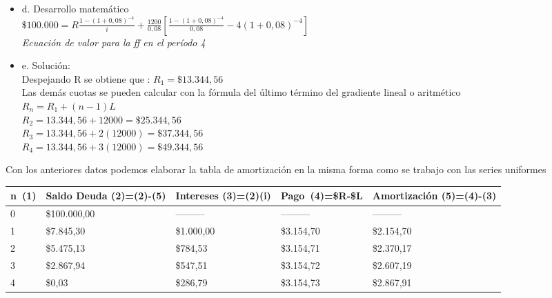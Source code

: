 \begin{itemize}
\begin{itemize}
			\item d. Desarrollo matemático\\
			$\$100.000 = R	\frac{1-(1+0,08)^{-4}}{i}+\frac{1200}{0,08}[\frac{1-(1+0,08)^{-4}}{0,08}- 4(1+0,08)^{-4}]$ 
			\\
			\textit{Ecuación de valor para la ff en el período 4}\\
			\item e. Solución:\\
			Despejando R se obtiene que : $R_{1} = \$13.344,56$\\
			Las demás cuotas se pueden calcular con la fórmula del último término del gradiente lineal o aritmético\\
			$R_{n} = R_{1} + (n-1)L$\\
			$R_{2} = 13.344,56 + 12000 = \$25.344,56$\\
			$R_{3} = 13.344,56 +2 (12000) = \$37.344,56$\\
			$R_{4} = 13.344,56 +3 (12000) = \$49.344,56$\\
		\end{itemize}
		
		Con los anteriores datos podemos elaborar la tabla de amortización en la misma forma como se trabajo con las series uniformes\\
		
		
    \begin{center}
        \begin{tabular}{|p{1cm}|p{2cm}|p{2cm}|p{2cm}|p{3cm}|}
        \hline 
        \rowcolor{white!50}
            \textbf{n\ (1)} & \textbf{Saldo Deuda (2)=(2)-(5)} & \textbf{Intereses  (3)=(2)(i)}& \textbf{Pago\ (4)=\$R-\$L }& \textbf{Amortización  (5)=(4)-(3)} \\ \hline                        
 
            0 & \$100.000,00 & --------- & --------- & ---------\\ \hline 
            1 & \$7.845,30  & \$1.000,00  & \$3.154,70  & \$2.154,70 \\ \hline
            2 & \$5.475,13  & \$784,53  & \$3.154,71  & \$2.370,17 \\ \hline
            3 & \$2.867,94 & \$547,51  & \$3.154,72 & \$2.607,19 \\ \hline
            4 & \$0,03  & \$286,79  & \$3.154,73  & \$2.867,91 \\ \hline


\end{tabular}
\end{center}
\end{itemize}
